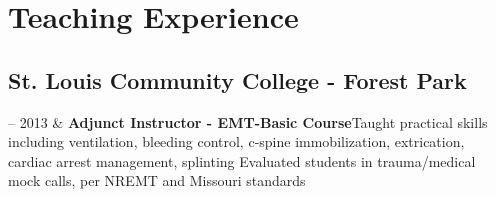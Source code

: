\documentclass[10pt, letterpaper]{article}
\newcommand{\Duration}[2]{\fontsize{9pt}{0}\selectfont #1 -- #2}
\newcommand{\Twoline}[2]{\textbf{#1}\newline  #2}
\begin{document}

\section{Teaching Experience}



\subsection{St. Louis Community College - Forest Park}


\begin{EntriesTable}
  \Duration{2010}{2013} &
  \Twoline{Adjunct Instructor - EMT-Basic Course}
  {Taught practical skills including ventilation, bleeding control, c-spine immobilization, extrication, cardiac arrest management, splinting \newline
  Evaluated students in trauma/medical mock calls, per NREMT and Missouri standards}
\end{EntriesTable}


\end{document}

